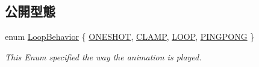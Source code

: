 \subsection*{公開型態}
\begin{DoxyCompactItemize}
\item 
enum \hyperlink{class_magnum_1_1_anim_base_ad6b3de9518d395df5ca9865f268ec581}{Loop\+Behavior} \{ \hyperlink{class_magnum_1_1_anim_base_ad6b3de9518d395df5ca9865f268ec581a5bbc9bad3c100ae73121051388db4d45}{O\+N\+E\+S\+H\+OT}, 
\hyperlink{class_magnum_1_1_anim_base_ad6b3de9518d395df5ca9865f268ec581a3c383eb240df3f1c307d16ff98b2f702}{C\+L\+A\+MP}, 
\hyperlink{class_magnum_1_1_anim_base_ad6b3de9518d395df5ca9865f268ec581a8b877225f523af406db47b5a700d443f}{L\+O\+OP}, 
\hyperlink{class_magnum_1_1_anim_base_ad6b3de9518d395df5ca9865f268ec581aeeefc34b0eb5b4ce79ff0c2e36f82f44}{P\+I\+N\+G\+P\+O\+NG}
 \}\begin{DoxyCompactList}\small\item\em This Enum specified the way the animation is played. \end{DoxyCompactList}
\end{DoxyCompactItemize}
